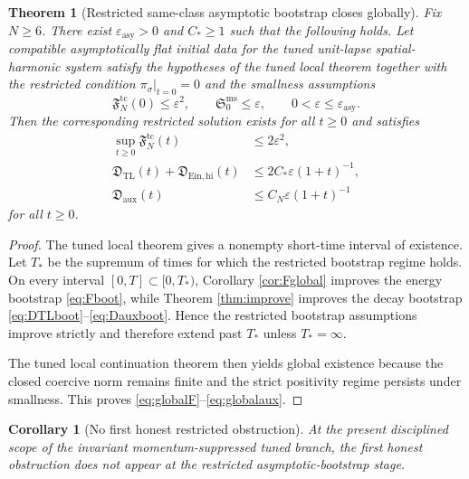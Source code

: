 \documentclass[11pt]{article}
\newtheorem{corollary}{Corollary}
\newtheorem{theorem}{Theorem}
\begin{document}
\begin{theorem}[Restricted same-class asymptotic bootstrap closes globally]
\label{thm:global}
Fix \(N\ge 6\). There exist \(\varepsilon_{\mathrm{asy}}>0\) and \(C_\ast\ge 1\) such that the following holds. Let compatible asymptotically flat initial data for the tuned unit-lapse spatial-harmonic system satisfy the hypotheses of the tuned local theorem together with the restricted condition \(\pi_\sigma|_{t=0}=0\) and the smallness assumptions
\begin{equation}
\mathfrak F_N^{\mathrm{tc}}(0)\le \varepsilon^2,
\qquad
\mathfrak S_0^{\mathrm{ms}}\le \varepsilon,
\qquad
0<\varepsilon\le \varepsilon_{\mathrm{asy}}.
\label{eq:smallasy}
\end{equation}
Then the corresponding restricted solution exists for all \(t\ge 0\) and satisfies
\begin{align}
\sup_{t\ge 0}\mathfrak F_N^{\mathrm{tc}}(t)
&\le 2\varepsilon^2,
\label{eq:globalF}
\\
\mathfrak D_{\mathrm{TL}}(t)
+ \mathfrak D_{\mathrm{Ein,hi}}(t)
&\le
2C_\ast\varepsilon(1+t)^{-1},
\label{eq:globalwave}
\\
\mathfrak D_{\mathrm{aux}}(t)
&\le
C_N\varepsilon(1+t)^{-1}
\label{eq:globalaux}
\end{align}
for all \(t\ge 0\).
\end{theorem}

\begin{proof}
The tuned local theorem gives a nonempty short-time interval of existence. Let \(T_\ast\) be the supremum of times for which the restricted bootstrap regime holds. On every interval \([0,T]\subset[0,T_\ast)\), Corollary \ref{cor:Fglobal} improves the energy bootstrap \eqref{eq:Fboot}, while Theorem \ref{thm:improve} improves the decay bootstrap \eqref{eq:DTLboot}--\eqref{eq:Dauxboot}. Hence the restricted bootstrap assumptions improve strictly and therefore extend past \(T_\ast\) unless \(T_\ast=\infty\).

The tuned local continuation theorem then yields global existence because the closed coercive norm remains finite and the strict positivity regime persists under smallness. This proves \eqref{eq:globalF}--\eqref{eq:globalaux}.
\end{proof}

\begin{corollary}[No first honest restricted obstruction]
\label{cor:noobs}
At the present disciplined scope of the invariant momentum-suppressed tuned branch, the first honest obstruction does \emph{not} appear at the restricted asymptotic-bootstrap stage.
\end{corollary}
\end{document}
